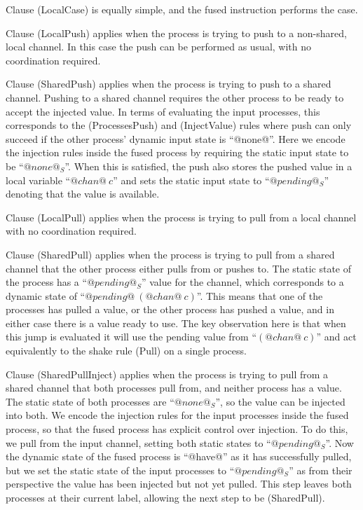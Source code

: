 Clause (LocalCase) is equally simple, and the fused instruction performs the case.

Clause (LocalPush) applies when the process is trying to push to a non-shared, local channel.
In this case the push can be performed as usual, with no coordination required.

Clause (SharedPush) applies when the process is trying to push to a shared channel.
Pushing to a shared channel requires the other process to be ready to accept the injected value.
In terms of evaluating the input processes, this corresponds to the (ProcessesPush) and (InjectValue) rules where push can only succeed if the other process' dynamic input state is ``@none@''.
Here we encode the injection rules inside the fused process by requiring the static input state to be ``$@none@_S$''.
When this is satisfied, the push also stores the pushed value in a local variable ``$@chan@~c$'' and sets the static input state to ``$@pending@_S$'' denoting that the value is available.

Clause (LocalPull) applies when the process is trying to pull from a local channel with no coordination required.

Clause (SharedPull) applies when the process is trying to pull from a shared channel that the other process either pulls from or pushes to.
The static state of the process has a ``$@pending@_S$'' value for the channel, which corresponds to a dynamic state of ``$@pending@~(@chan@~c)$''.
This means that one of the processes has pulled a value, or the other process has pushed a value, and in either case there is a value ready to use.
The key observation here is that when this jump is evaluated it will use the pending value from ``$(@chan@~c)$'' and act equivalently to the shake rule (Pull) on a single process.

Clause (SharedPullInject) applies when the process is trying to pull from a shared channel that both processes pull from, and neither process has a value.
The static state of both processes are ``$@none@_S$'', so the value can be injected into both.
We encode the injection rules for the input processes inside the fused process, so that the fused process has explicit control over injection.
To do this, we pull from the input channel, setting both static states to ``$@pending@_S$''.
Now the dynamic state of the fused process is ``@have@'' as it has successfully pulled, but we set the static state of the input processes to ``$@pending@_S$'' as from their perspective the value has been injected but not yet pulled.
This step leaves both processes at their current label, allowing the next step to be (SharedPull).

